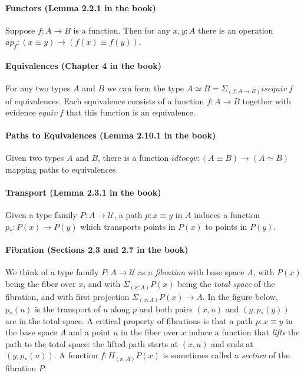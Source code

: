 \documentclass{entcs}
\begin{document}
\paragraph*{Functors (Lemma 2.2.1 in the book)} Suppose $f : A \to B$ is a
function. Then for any $x,y:A$ there is an operation
$\mathit{ap}_f : (x \equiv y) \to (f(x) \equiv f(y))$.

\paragraph*{Equivalences (Chapter 4 in the book)} For any two types $A$ and $B$
we can form the type $A \simeq B = \Sigma_{(f : A \to B)} \mathit{isequiv}~f$ of
equivalences. Each equivalence consists of a function $f : A \to B$ together
with evidence $\mathit{equiv}~f$ that this function is an equivalence.

\paragraph*{Paths to Equivalences (Lemma 2.10.1 in the book)} Given two types
$A$ and $B$, there is a function
$\mathit{idtoeqv} : (A \equiv B) \to (A \simeq B)$ mapping paths to
equivalences.

\paragraph*{Transport (Lemma 2.3.1 in the book)} Given a type family
$P : A \to \mathcal{U}$, a path $p : x \equiv y$ in $A$ induces a function
$p_* : P(x) \to P(y)$ which transports points in $P(x)$ to points in $P(y)$.

\paragraph*{Fibration (Sections 2.3 and 2.7 in the book)} We think of a type
family $P : A \to \mathcal{U}$ as a \emph{fibration} with base space $A$, with
$P(x)$ being the fiber over $x$, and with $\Sigma_{(x:A)} P(x)$ being the
\emph{total space} of the fibration, and with first projection
$\Sigma_{(x:A)} P(x) \to A$. In the figure below, $p_*(u)$ is the transport of
$u$ along $p$ and both pairs $(x,u)$ and $(y,p_*(y))$ are in the total space. A
critical property of fibrations is that a path $p : x \equiv y$ in the base
space $A$ and a point $u$ in the fiber over $x$ induce a function that
\emph{lifts} the path to the total space: the lifted path starts at $(x,u)$ and
ends at $(y,p_*(u))$. A function $f : \Pi_{(x:A)} P(x)$ is sometimes called a
\emph{section} of the fibration $P$.
\end{document}
